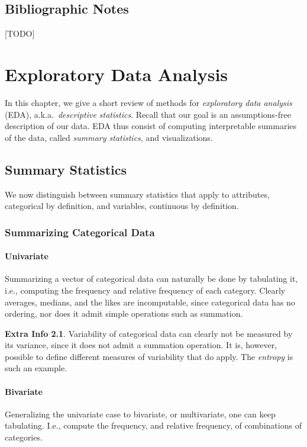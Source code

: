 \documentclass[12pt,a4paper]{report}
\theoremstyle{plain}
\theoremstyle{definition}
\newtheorem{extra}{Extra Info}
\newcommand{\aka}{{a.k.a.\ }}
\begin{document}
\section{Bibliographic Notes}
[TODO] 
\chapter{Exploratory Data Analysis}
\label{sec:exploratory}


In this chapter, we give a short review of methods for \emph{exploratory data analysis} (EDA), \aka \emph{descriptive statistics}.
Recall that our goal is an assumptions-free description of our data. 
EDA thus consist of computing interpretable summaries of the data, called \emph{summary statistics}, and visualizations. 


\section{Summary Statistics}
\label{sec:summary_statistics}

We now distinguish between summary statistics that apply to attributes, categorical by definition, and variables, continuous by definition. 


\subsection{Summarizing Categorical Data}

\subsubsection{Univariate}
Summarizing a vector of categorical data can naturally be done by tabulating it, i.e., computing the frequency and relative frequency of each category.
Clearly averages, medians, and the likes are incomputable, since categorical data has no ordering, nor does it admit simple operations such as summation.

\begin{extra}
Variability of categorical data can clearly not be measured by its variance, since it does not admit a summation operation.
It is, however, possible to define different measures of variability that do apply.
The \emph{entropy} is such an example.
\end{extra}


\subsubsection{Bivariate}
Generalizing the univariate case to bivariate, or multivariate, one can keep tabulating. I.e., compute the frequency, and relative frequency, of combinations of categories.
\end{document}
